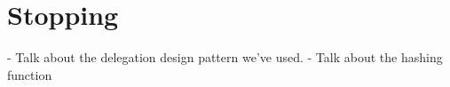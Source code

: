 
\section{Stopping}
\label{sec:stopping}

- Talk about the delegation design pattern we've used.
- Talk about the hashing function
